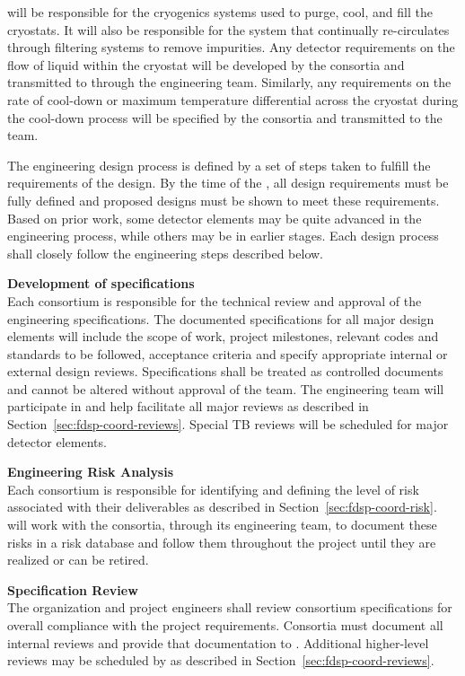  will be responsible for the cryogenics systems used to purge,
cool, and fill the cryostats.  It will also be responsible for the
system that continually re-circulates \lar through filtering
systems to remove impurities.  Any detector requirements on the flow
of liquid within the cryostat %
will be developed by the consortia and
transmitted to  through the  engineering team.  Similarly,
any requirements on the rate of cool-down or maximum temperature
differential across the cryostat during the cool-down process will %
be specified by the consortia and transmitted to the  team.

The engineering design process is defined by a set of steps taken to
fulfill the requirements of the design.  By the time of the , 
all design requirements must be fully defined and
proposed designs must be shown to meet these requirements.  Based on
prior work, some detector elements may be quite advanced in the
engineering process, while others may be in earlier stages.  Each
design process shall closely follow the engineering steps described
below.


{\bf Development of specifications}\\ Each consortium is responsible
for the technical review and approval of the engineering
specifications.  The documented specifications for all major design
elements will %
include the scope of work, project milestones,
relevant codes and standards to be followed, acceptance criteria and
specify appropriate internal or external design reviews.
Specifications shall be treated as controlled documents and cannot be
altered without approval of the 
team.  The  engineering team will participate in and help facilitate
all major reviews as described in
Section~\ref{sec:fdsp-coord-reviews}.  Special TB reviews
will be scheduled for major detector elements.

{\bf Engineering Risk Analysis}\\ Each consortium is responsible for
identifying and defining the level of risk associated with their
deliverables as described in Section~\ref{sec:fdsp-coord-risk}.
 will work with the consortia,
through its  engineering team, to document these risks in a risk
database and follow them throughout the project until they are
realized or can be retired.

{\bf Specification Review}\\
The   organization and project engineers
shall review consortium specifications for overall compliance with the
project requirements.  Consortia must document all internal reviews
and provide that documentation to .
Additional higher-level reviews may be scheduled by 
as described in Section~\ref{sec:fdsp-coord-reviews}.

